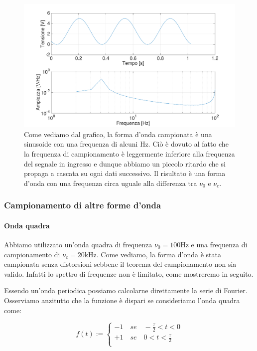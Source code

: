 \begin{figure}[H]
\centering
	\includegraphics[width=.63\textwidth]{../E13/latex/sin100hz@100,97.pdf}
	\caption{Come vediamo dal grafico, la forma d'onda campionata è una sinusoide con una frequenza di alcuni Hz. Ciò è dovuto al fatto che la frequenza di campionamento è leggermente inferiore alla frequenza del segnale in ingresso e dunque abbiamo un piccolo ritardo che si propaga a cascata su ogni dati successivo. Il risultato è una forma d'onda con una frequenza circa uguale alla differenza tra $\nu_0$ e $\nu_c$.}
	\label{sin3}
\end{figure}

\subsubsection{Campionamento di altre forme d'onda}

\paragraph{Onda quadra \newline}
Abbiamo utilizzato un'onda quadra di frequenza $\nu_0=100 \si{\hertz}$ e una frequenza di campionamento di $\nu_c=20\si{\kilo\hertz}$. Come vediamo, la forma d'onda è stata campionata senza distorsioni sebbene il teorema del campionamento non sia valido. Infatti lo spettro di frequenze non è limitato, come mostreremo in seguito.

Essendo un'onda periodica possiamo calcolarne direttamente la serie di Fourier. Osserviamo anzitutto che la funzione è dispari se consideriamo l'onda quadra come: 

\begin{displaymath}
f(t):=
\begin{cases}
-1 \quad se \quad -\frac{\tau}{2}<t<0 \\
+1 \quad se \quad 0<t<\frac{\tau}{2} \\ 
\end{cases}
\end{displaymath}

